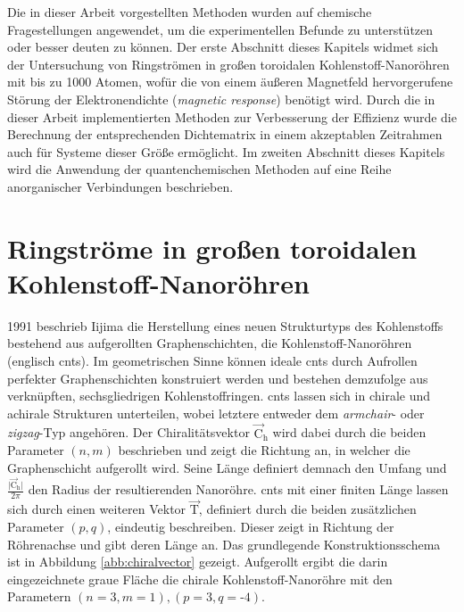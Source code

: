 Die in dieser Arbeit vorgestellten Methoden wurden auf chemische Fragestellungen angewendet, um die experimentellen Befunde zu unterstützen oder besser deuten zu können.
Der erste Abschnitt dieses Kapitels widmet sich der Untersuchung von Ringströmen in großen toroidalen Kohlenstoff-Nanoröhren mit bis zu 1000 Atomen, wofür die von einem äußeren Magnetfeld hervorgerufene Störung der Elektronendichte (\textit{magnetic response}) benötigt wird. Durch die in dieser Arbeit implementierten Methoden zur Verbesserung der Effizienz wurde die Berechnung der entsprechenden Dichtematrix in einem akzeptablen Zeitrahmen auch für Systeme dieser Größe ermöglicht. Im zweiten Abschnitt dieses Kapitels wird die Anwendung der quantenchemischen Methoden auf eine Reihe anorganischer Verbindungen beschrieben.  

\section{Ringströme in großen toroidalen Kohlenstoff-Nanoröhren}
1991 beschrieb Iijima\supercite{iijima1991helical} die Herstellung eines neuen Strukturtyps des Kohlenstoffs bestehend aus aufgerollten Graphenschichten, die Kohlenstoff-Nanoröhren (englisch \acp{cnt}). Im geometrischen Sinne können ideale \acp{cnt} durch Aufrollen perfekter Graphenschichten konstruiert werden und bestehen demzufolge aus verknüpften, sechsgliedrigen Kohlenstoffringen. \acp{cnt} lassen sich in chirale und achirale Strukturen unterteilen, wobei letztere entweder dem \textit{armchair}- oder \textit{zigzag}-Typ angehören. Der Chiralitätsvektor $\vec{\text{C}}_\text{h}$ wird dabei durch die beiden Parameter $(n,m)$ beschrieben und zeigt die Richtung an, in welcher die Graphenschicht aufgerollt wird. Seine Länge definiert demnach den Umfang und $\frac{\vert\vec{\text{C}}_\text{h}\vert}{2\pi}$ den Radius der resultierenden Nanoröhre. \acp{cnt} mit einer finiten Länge lassen sich durch einen weiteren Vektor $\vec{\text{T}}$, definiert durch die beiden zusätzlichen Parameter $(p,q)$, eindeutig beschreiben. Dieser zeigt in Richtung der Röhrenachse und gibt deren Länge an. Das grundlegende Konstruktionsschema ist in Abbildung \ref{abb:chiralvector} gezeigt. Aufgerollt ergibt die darin eingezeichnete graue Fläche die chirale Kohlenstoff-Nanoröhre mit den Parametern $(n=3,m=1),(p=3,q=\textrm{-}4)$.
